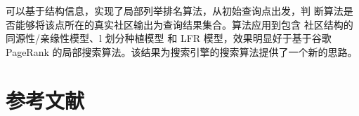 \documentclass[a4paper]{apa6}
\begin{document}
可以基于结构信息，实现了局部列举排名算法，从初始查询点出发，判 断算法是否能够将该点所在的真实社区输出为查询结果集合。算法应用到包含 社区结构的同源性/亲缘性模型、l 划分种植模型 和 LFR 模型，效果明显好于基于谷歌 PageRank 的局部搜索算法。该结果为搜索引擎的搜索算法提供了一个新的思路。

\section{参考文献}
\label{sec:org9101910}


\end{document}

